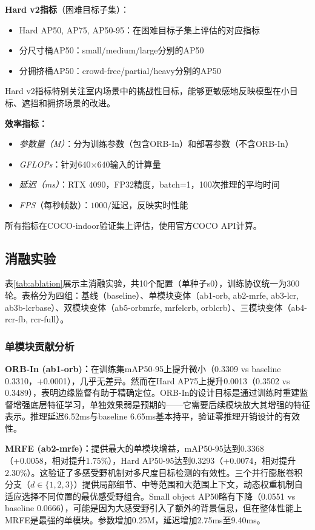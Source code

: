 \documentclass[journal]{IEEEtran}
\begin{document}
\textbf{Hard v2指标}（困难目标子集）：
\begin{itemize}
    \item Hard AP50, AP75, AP50-95：在困难目标子集上评估的对应指标
    \item 分尺寸桶AP50：small/medium/large分别的AP50
    \item 分拥挤桶AP50：crowd-free/partial/heavy分别的AP50
\end{itemize}

Hard v2指标特别关注室内场景中的挑战性目标，能够更敏感地反映模型在小目标、遮挡和拥挤场景的改进。

\textbf{效率指标：}
\begin{itemize}
    \item \textit{参数量（M）}：分为训练参数（包含ORB-In）和部署参数（不含ORB-In）
    \item \textit{GFLOPs}：针对640$\times$640输入的计算量
    \item \textit{延迟（ms）}：RTX 4090，FP32精度，batch=1，100次推理的平均时间
    \item \textit{FPS}（每秒帧数）：$1000 / \text{延迟}$，反映实时性能
\end{itemize}

所有指标在COCO-indoor验证集上评估，使用官方COCO API计算。


\subsection{消融实验}
\label{subsec:ablation_study}

表\ref{tab:ablation}展示主消融实验，共10个配置（单种子s0），训练协议统一为300轮。表格分为四组：基线（baseline）、单模块变体（ab1-orb, ab2-mrfe, ab3-lcr, ab3b-lcrbase）、双模块变体（ab5-orbmrfe, mrfelcrb, orblcrb）、三模块变体（ab4-rcr-fb, rcr-full）。

\subsubsection{单模块贡献分析}

\textbf{ORB-In (ab1-orb)：}在训练集mAP50-95上提升微小（0.3309 vs baseline 0.3310，+0.0001），几乎无差异。然而在Hard AP75上提升0.0013（0.3502 vs 0.3489），表明边缘监督有助于精确定位。ORB-In的设计目标是通过训练时重建监督增强底层特征学习，单独效果弱是预期的——它需要后续模块放大其增强的特征表示。推理延迟6.52ms与baseline 6.65ms基本持平，验证零推理开销设计的有效性。

\textbf{MRFE (ab2-mrfe)：}提供最大的单模块增益，mAP50-95达到0.3368（+0.0058，相对提升1.75\%），Hard AP50-95达到0.3293（+0.0074，相对提升2.30\%）。这验证了多感受野机制对多尺度目标检测的有效性。三个并行膨胀卷积分支（$d\in\{1,2,3\}$）提供局部细节、中等范围和大范围上下文，动态权重机制自适应选择不同位置的最优感受野组合。Small object AP50略有下降（0.0551 vs baseline 0.0666），可能是因为大感受野引入了额外的背景信息，但在整体性能上MRFE是最强的单模块。参数增加0.25M，延迟增加2.75ms至9.40ms。
\end{document}
